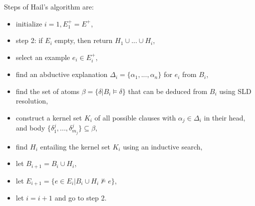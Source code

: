 Steps of Hail's algorithm are:
\begin{itemize}
\item initialize $i=1, E_1^+=E^+$,
\item step 2: if $E_i$ empty, then return  $H_1 \cup ... \cup H_i$,
\item select an example $e_i \in E_i^+$,
\item find an abductive explanation $\Delta_i=\{\alpha_1, ..., \alpha_n\}$ for $e_i$ from $B_i$,
\item find the set of atoms $\beta=\{\delta | B_i \models \delta\}$ that can be deduced from $B_i$ using SLD resolution,
\item construct a kernel set $K_i$ of all possible clauses with $\alpha_j \in \Delta_i$ in their head, and body $\{\delta^j_1, ..., \delta^j_{m_j}\} \subseteq \beta$,
\item find $H_i$ entailing the kernel set $K_i$ using an inductive search\cite{ray2005phdHybrid},
\item let $B_{i+1}=B_i \cup H_i$,
\item let $E_{i+1}=\{e \in E_i | B_i \cup H_i \not\models e\}$,
\item let $i=i+1$ and go to step 2.
\end{itemize}
